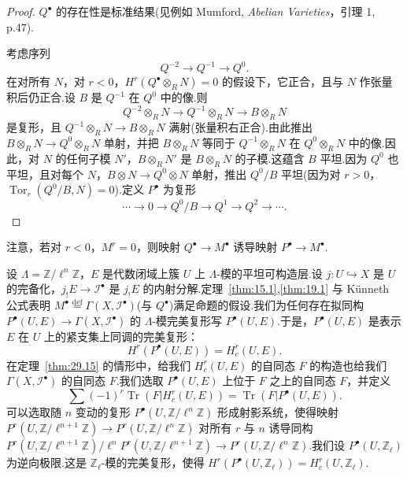 \begin{proof}
$Q^{\bullet}$ 的存在性是标准结果(见例如 Mumford, \emph{Abelian Varieties}，引理 1, p.47).

考虑序列
\[
Q^{-2} \to Q^{-1} \to Q^{0}.
\]
在对所有 $N$，对 $r < 0$，$H^{r}(Q^{\bullet} \otimes_{R} N) = 0$ 的假设下，它正合，且与 $N$ 作张量积后仍正合.设 $B$ 是 $Q^{-1}$ 在 $Q^{0}$ 中的像.则
\[
Q^{-2} \otimes_{R} N \to Q^{-1} \otimes_{R} N \to B \otimes_{R} N
\]
是复形，且 $Q^{-1} \otimes_{R} N \to B \otimes_{R} N$ 满射(张量积右正合).由此推出 $B \otimes_{R} N \to Q^{0} \otimes_{R} N$ 单射，并把 $B \otimes_{R} N$ 等同于 $Q^{-1} \otimes_{R} N$ 在 $Q^{0} \otimes_{R} N$ 中的像.因此，对 $N$ 的任何子模 $N'$，$B \otimes_{R} N'$ 是 $B \otimes_{R} N$ 的子模.这蕴含 $B$ 平坦.因为 $Q^{0}$ 也平坦，且对每个 $N$，$B \otimes N \to Q^{0} \otimes N$ 单射，推出 $Q^{0}/B$ 平坦(因为对 $r > 0$，$\operatorname{Tor}_r(Q^{0}/B, N) = 0$).定义 $P^{\bullet}$ 为复形
\[
\cdots \to 0 \to Q^{0}/B \to Q^{1} \to Q^{2} \to \cdots.
\]
\end{proof}

注意，若对 $r < 0$，$M^{r} = 0$，则映射 $Q^{\bullet} \to M^{\bullet}$ 诱导映射 $P^{\bullet} \to M^{\bullet}$.

设 $\Lambda = \mathbb{Z}/\ell^{n}\mathbb{Z}$，$E$ 是代数闭域上簇 $U$ 上 $\Lambda$-模的平坦可构造层.设 $j \colon U \hookrightarrow X$ 是 $U$ 的完备化，$j_{!}E \to \mathcal{I}^{\bullet}$ 是 $j_{!}E$ 的内射分解.定理~\ref{thm:15.1},\ref{thm:19.1} 与 K\"unneth 公式表明 $M^{\bullet} \overset{\mathrm{def}}{=} \Gamma(X, \mathcal{I}^{\bullet})$(与 $Q^{\bullet}$)满足命题的假设.我们为任何存在拟同构 $P^{\bullet}(U, E) \to \Gamma(X, \mathcal{I}^{\bullet})$ 的 $\Lambda$-模完美复形写 $P^{\bullet}(U, E)$.于是，$P^{\bullet}(U, E)$ 是表示 $E$ 在 $U$ 上的紧支集上同调的完美复形：
\[
H^{r}(P^{\bullet}(U, E)) = H^{r}_{c}(U, E).
\]
在定理~\ref{thm:29.15} 的情形中，给我们 $H^{r}_{c}(U, E)$ 的自同态 $F$ 的构造也给我们 $\Gamma(X, \mathcal{I}^{\bullet})$ 的自同态 $F$.我们选取 $P^{\bullet}(U, E)$ 上位于 $F$ 之上的自同态 $F$，并定义
\[
\sum (-1)^{r} \operatorname{Tr}(F|H^{r}_{c}(U, E)) = \operatorname{Tr}(F|P^{\bullet}(U, E)).
\]
可以选取随 $n$ 变动的复形 $P^{\bullet}(U, \mathbb{Z}/\ell^{n}\mathbb{Z})$ 形成射影系统，使得映射 $P^{r}(U, \mathbb{Z}/\ell^{n+1}\mathbb{Z}) \to P^{r}(U, \mathbb{Z}/\ell^{n}\mathbb{Z})$ 对所有 $r$ 与 $n$ 诱导同构 $P^{r}(U, \mathbb{Z}/\ell^{n+1}\mathbb{Z})/\ell^{n}P^{r}(U, \mathbb{Z}/\ell^{n+1}\mathbb{Z}) \to P^{r}(U, \mathbb{Z}/\ell^{n}\mathbb{Z})$.我们设 $P^{\bullet}(U, \mathbb{Z}_{\ell})$ 为逆向极限.这是 $\mathbb{Z}_{\ell}$-模的完美复形，使得 $H^{r}(P^{\bullet}(U, \mathbb{Z}_{\ell})) = H^{r}_{c}(U, \mathbb{Z}_{\ell})$.

